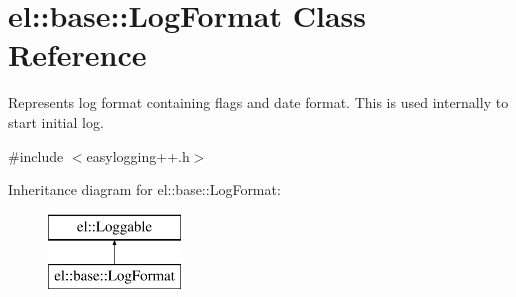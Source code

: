 \hypertarget{classel_1_1base_1_1_log_format}{}\section{el\+:\+:base\+:\+:Log\+Format Class Reference}
\label{classel_1_1base_1_1_log_format}


Represents log format containing flags and date format. This is used internally to start initial log.  




{\ttfamily \#include $<$easylogging++.\+h$>$}

Inheritance diagram for el\+:\+:base\+:\+:Log\+Format\+:\begin{figure}[H]
\begin{center}
\leavevmode
\includegraphics[height=2.000000cm]{classel_1_1base_1_1_log_format}
\end{center}
\end{figure}
